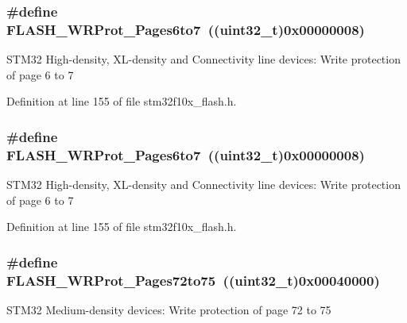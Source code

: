 \subsubsection[{\texorpdfstring{F\+L\+A\+S\+H\+\_\+\+W\+R\+Prot\+\_\+\+Pages6to7}{FLASH_WRProt_Pages6to7}}]{\setlength{\rightskip}{0pt plus 5cm}\#define F\+L\+A\+S\+H\+\_\+\+W\+R\+Prot\+\_\+\+Pages6to7~(({\bf uint32\+\_\+t})0x00000008)}\hypertarget{group___option___bytes___write___protection_ga289b919ff7f6e7287facf108b8b94619}{}\label{group___option___bytes___write___protection_ga289b919ff7f6e7287facf108b8b94619}
S\+T\+M32 High-\/density, X\+L-\/density and Connectivity line devices\+: Write protection of page 6 to 7 

Definition at line 155 of file stm32f10x\+\_\+flash.\+h.

\subsubsection[{\texorpdfstring{F\+L\+A\+S\+H\+\_\+\+W\+R\+Prot\+\_\+\+Pages6to7}{FLASH_WRProt_Pages6to7}}]{\setlength{\rightskip}{0pt plus 5cm}\#define F\+L\+A\+S\+H\+\_\+\+W\+R\+Prot\+\_\+\+Pages6to7~(({\bf uint32\+\_\+t})0x00000008)}\hypertarget{group___option___bytes___write___protection_ga289b919ff7f6e7287facf108b8b94619}{}\label{group___option___bytes___write___protection_ga289b919ff7f6e7287facf108b8b94619}
S\+T\+M32 High-\/density, X\+L-\/density and Connectivity line devices\+: Write protection of page 6 to 7 

Definition at line 155 of file stm32f10x\+\_\+flash.\+h.

\subsubsection[{\texorpdfstring{F\+L\+A\+S\+H\+\_\+\+W\+R\+Prot\+\_\+\+Pages72to75}{FLASH_WRProt_Pages72to75}}]{\setlength{\rightskip}{0pt plus 5cm}\#define F\+L\+A\+S\+H\+\_\+\+W\+R\+Prot\+\_\+\+Pages72to75~(({\bf uint32\+\_\+t})0x00040000)}\hypertarget{group___option___bytes___write___protection_ga1a19c52012bbb30f3ae1599fa5a200cc}{}\label{group___option___bytes___write___protection_ga1a19c52012bbb30f3ae1599fa5a200cc}
S\+T\+M32 Medium-\/density devices\+: Write protection of page 72 to 75 

